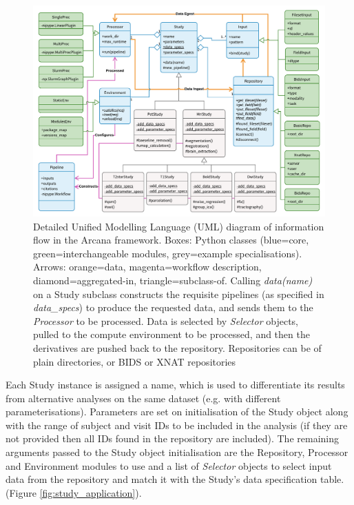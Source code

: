 \documentclass[smallextended]{svjour3}       %
\begin{document}
\begin{figure}
	\centering
    \includegraphics[width=\textwidth]{figures/full_arcana_uml}
  \caption{Detailed Unified Modelling Language (UML) diagram of
information flow in the Arcana framework. Boxes: Python classes
(blue=core, green=interchangeable modules, grey=example
specialisations). Arrows: orange=data, magenta=workflow description,
diamond=aggregated-in, triangle=subclass-of. Calling \emph{data(name)}
on a Study subclass constructs the requisite pipelines (as specified in
\emph{data\_specs}) to produce the requested data, and sends them
to the \emph{Processor} to be processed. Data is selected by
\emph{Selector} objects, pulled to the compute environment to be
processed, and then the derivatives are pushed back to the repository.
Repositories can be of plain directories, or BIDS or XNAT repositories}
\label{fig:full_uml}
\end{figure}

Each Study instance is assigned a name, which is used to differentiate its
results from alternative analyses on the same dataset (e.g. with different
parameterisations). Parameters are set on initialisation of the Study object
along with the range of subject and visit IDs to be included in the analysis
(if they are not provided then all IDs found in the repository are included).
The remaining arguments passed to the Study object initialisation are the
Repository, Processor and Environment modules to use and a list of
\emph{Selector} objects to select input data from the repository and match
it with the Study's data specification table.
(Figure \ref{fig:study_application}).
\end{document}
